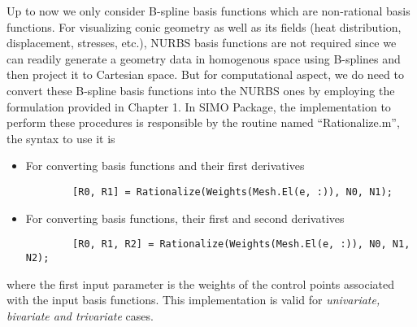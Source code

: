 Up to now we only consider B-spline basis functions which are non-rational basis functions. For visualizing conic geometry as well as its fields (heat distribution, displacement, stresses, etc.), NURBS basis functions are not required since we can readily generate a geometry data in homogenous space using B-splines and then project it to Cartesian space. But for computational aspect, we do need to convert these B-spline basis functions into the NURBS ones by employing the formulation provided in Chapter 1. In SIMO Package, the implementation to perform these procedures is responsible by the routine named ``Rationalize.m'', the syntax to use it is
\begin{itemize}
    \item For converting basis functions and their first derivatives
    \begin{lstlisting}
        [R0, R1] = Rationalize(Weights(Mesh.El(e, :)), N0, N1);
    \end{lstlisting}
    \item For converting basis functions, their first and second derivatives
    \begin{lstlisting}
        [R0, R1, R2] = Rationalize(Weights(Mesh.El(e, :)), N0, N1, N2);
    \end{lstlisting}
\end{itemize}
where the first input parameter is the weights of the control points associated with the input basis functions. This implementation is valid for \emph{univariate, bivariate and trivariate} cases.


